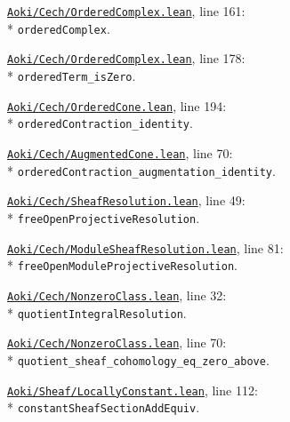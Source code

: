 \begin{leansources}
\item \href{../../../lean/Aoki/Cech/OrderedComplex.lean}{\nolinkurl{Aoki/Cech/OrderedComplex.lean}}, line 161:\\*
\nolinkurl{orderedComplex}.
\item \href{../../../lean/Aoki/Cech/OrderedComplex.lean}{\nolinkurl{Aoki/Cech/OrderedComplex.lean}}, line 178:\\*
\nolinkurl{orderedTerm_isZero}.
\item \href{../../../lean/Aoki/Cech/OrderedCone.lean}{\nolinkurl{Aoki/Cech/OrderedCone.lean}}, line 194:\\*
\nolinkurl{orderedContraction_identity}.
\item \href{../../../lean/Aoki/Cech/AugmentedCone.lean}{\nolinkurl{Aoki/Cech/AugmentedCone.lean}}, line 70:\\*
\nolinkurl{orderedContraction_augmentation_identity}.
\item \href{../../../lean/Aoki/Cech/SheafResolution.lean}{\nolinkurl{Aoki/Cech/SheafResolution.lean}}, line 49:\\*
\nolinkurl{freeOpenProjectiveResolution}.
\item \href{../../../lean/Aoki/Cech/ModuleSheafResolution.lean}{\nolinkurl{Aoki/Cech/ModuleSheafResolution.lean}}, line 81:\\*
\nolinkurl{freeOpenModuleProjectiveResolution}.
\end{leansources}

\begin{leansources}
\item \href{../../../lean/Aoki/Cech/NonzeroClass.lean}{\nolinkurl{Aoki/Cech/NonzeroClass.lean}}, line 32:\\*
\nolinkurl{quotientIntegralResolution}.
\item \href{../../../lean/Aoki/Cech/NonzeroClass.lean}{\nolinkurl{Aoki/Cech/NonzeroClass.lean}}, line 70:\\*
\nolinkurl{quotient_sheaf_cohomology_eq_zero_above}.
\item \href{../../../lean/Aoki/Sheaf/LocallyConstant.lean}{\nolinkurl{Aoki/Sheaf/LocallyConstant.lean}}, line 112:\\*
\nolinkurl{constantSheafSectionAddEquiv}.
\end{leansources}

